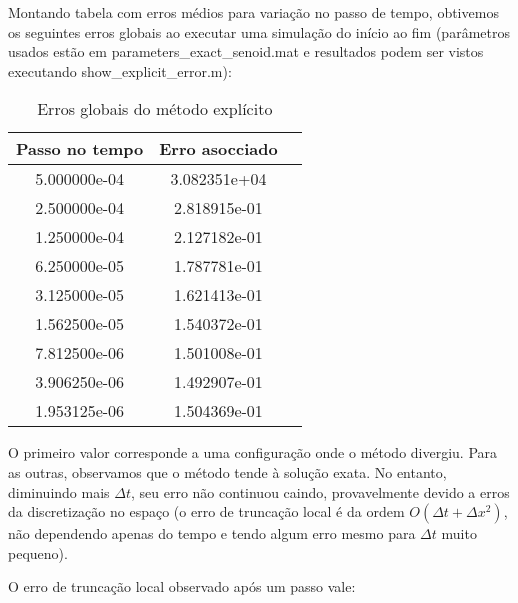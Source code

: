 \documentclass[12pt,fleqn]{article}
\begin{document}
Montando tabela com erros médios para variação no passo de tempo, obtivemos os seguintes erros globais ao executar uma simulação do início ao fim (parâmetros usados estão em parameters\_exact\_senoid.mat e resultados podem ser vistos executando show\_explicit\_error.m):

\begin{table}[htb]
\begin{center}
		\begin{tabular}{|c|c|c|}\hline
			Passo no tempo & Erro asocciado \\\hline
			5.000000e-04 & 3.082351e+04 \\\hline
			2.500000e-04 & 2.818915e-01 \\\hline
			1.250000e-04 & 2.127182e-01 \\\hline
			6.250000e-05 & 1.787781e-01 \\\hline
			3.125000e-05 & 1.621413e-01 \\\hline
			1.562500e-05 & 1.540372e-01 \\\hline
			7.812500e-06 & 1.501008e-01 \\\hline
			3.906250e-06 & 1.492907e-01 \\\hline
			1.953125e-06 & 1.504369e-01 \\\hline
		\end{tabular}
\caption{Erros globais do método explícito}
\end{center}
\end{table}

O primeiro valor corresponde a uma configuração onde o método divergiu. Para as outras, observamos que o método tende à solução exata. No entanto, diminuindo mais $\Delta t$, seu erro não continuou caindo, provavelmente devido a erros da discretização no espaço (o erro de truncação local é da ordem $O(\Delta t + \Delta x^2)$, não dependendo apenas do tempo e tendo algum erro mesmo para $\Delta t$ muito pequeno).

O erro de truncação local observado após um passo vale:
\end{document}
